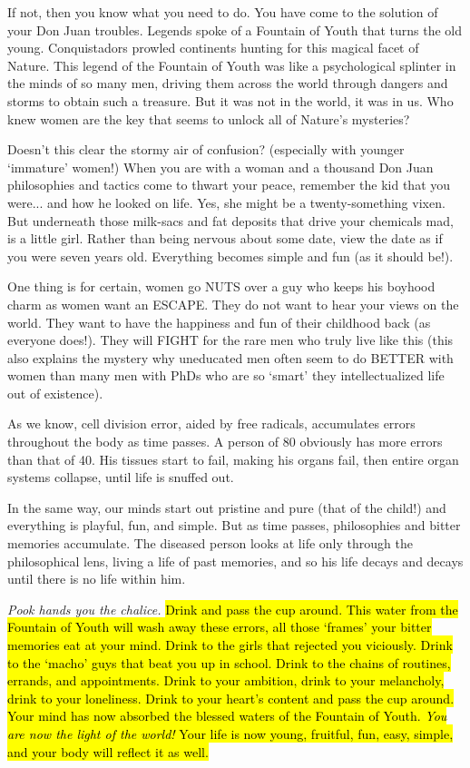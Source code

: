 			If not, then you know what you need to do. You have come to the solution of your Don Juan troubles. Legends spoke of a Fountain of Youth that turns the old young. Conquistadors prowled continents hunting for this magical facet of Nature. This legend of the Fountain of Youth was like a psychological splinter in the minds of so many men, driving them across the world through dangers and storms to obtain such a treasure. But it was not in the world, it was in us. Who knew women are the key that seems to unlock all of Nature's mysteries?

			Doesn't this clear the stormy air of confusion? (especially with younger `immature' women!) When you are with a woman and a thousand Don Juan philosophies and tactics come to thwart your peace, remember the kid that you were... and how he looked on life. Yes, she might be a twenty-something vixen. But underneath those milk-sacs and fat deposits that drive your chemicals mad, is a little girl. Rather than being nervous about some date, view the date as if you were seven years old. Everything becomes simple and fun (as it should be!).

			One thing is for certain, women go NUTS over a guy who keeps his boyhood charm as women want an ESCAPE. They do not want to hear your views on the world. They want to have the happiness and fun of their childhood back (as everyone does!). They will FIGHT for the rare men who truly live like this (this also explains the mystery why uneducated men often seem to do BETTER with women than many men with PhDs who are so `smart' they intellectualized life out of existence).

			As we know, cell division error, aided by free radicals, accumulates errors throughout the body as time passes. A person of 80 obviously has more errors than that of 40. His tissues start to fail, making his organs fail, then entire organ systems collapse, until life is snuffed out.

			In the same way, our minds start out pristine and pure (that of the child!) and everything is playful, fun, and simple. But as time passes, philosophies and bitter memories accumulate. The diseased person looks at life only through the philosophical lens, living a life of past memories, and so his life decays and decays until there is no life within him.

			\textit{Pook hands you the chalice.} \hl{Drink and pass the cup around. This water from the Fountain of Youth will wash away these errors, all those `frames' your bitter memories eat at your mind. Drink to the girls that rejected you viciously. Drink to the `macho' guys that beat you up in school. Drink to the chains of routines, errands, and appointments. Drink to your ambition, drink to your melancholy, drink to your loneliness. Drink to your heart's content and pass the cup around. Your mind has now absorbed the blessed waters of the Fountain of Youth. \textit{You are now the light of the world!} Your life is now young, fruitful, fun, easy, simple, and your body will reflect it as well.}

